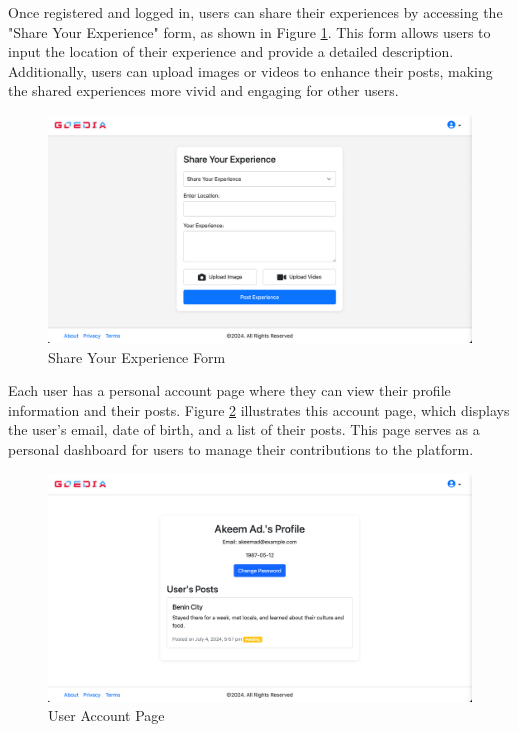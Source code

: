 Once registered and logged in, users can share their experiences by accessing the "Share Your Experience" form, as shown in Figure \ref{fig:share}. This form allows users to input the location of their experience and provide a detailed description. Additionally, users can upload images or videos to enhance their posts, making the shared experiences more vivid and engaging for other users.

\begin{figure}[H]
    \centering
    \includegraphics[width=\textwidth]{share.png}
    \caption{Share Your Experience Form}
    \label{fig:share}
\end{figure}

Each user has a personal account page where they can view their profile information and their posts. Figure \ref{fig:useraccount} illustrates this account page, which displays the user's email, date of birth, and a list of their posts. This page serves as a personal dashboard for users to manage their contributions to the platform.

\begin{figure}[H]
    \centering
    \includegraphics[width=\textwidth]{useraccount.png}
    \caption{User Account Page}
    \label{fig:useraccount}
\end{figure}

